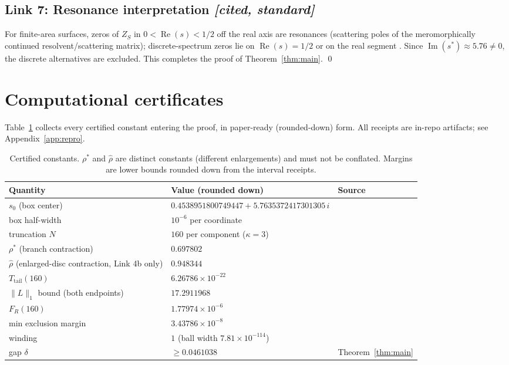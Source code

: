 \documentclass[11pt]{article}
\theoremstyle{definition}
\theoremstyle{remark}
\renewcommand{\Re}{\operatorname{Re}}
\renewcommand{\Im}{\operatorname{Im}}
\newcommand{\norm}[1]{\lVert #1 \rVert}
\begin{document}
\subsection*{Link 7: Resonance interpretation \emph{[cited, standard]}}

For finite-area surfaces, zeros of $Z_S$ in $0 < \Re(s) < 1/2$ off the
real axis are resonances (scattering poles of the meromorphically
continued resolvent/scattering matrix); discrete-spectrum zeros lie on
$\Re(s) = 1/2$ or on the real segment
\cite{HejhalLNM1001,IwaniecGSM53,BorthwickBook}. Since
$\Im(s^*) \approx 5.76 \neq 0$, the discrete alternatives are excluded.
This completes the proof of Theorem~\ref{thm:main}. \qed

\section{Computational certificates}
\label{sec:certs}

Table~\ref{tab:constants} collects every certified constant entering
the proof, in paper-ready (rounded-down) form. All receipts are
in-repo artifacts; see Appendix~\ref{app:repro}.

\begin{table}[h]
\centering
\begin{tabular}{lll}
\hline
Quantity & Value (rounded down) & Source \\
\hline
$s_0$ (box center) & $0.4538951800749447 + 5.7635372417301305\,i$ & \cite{R3bReceipt} \\
box half-width & $10^{-6}$ per coordinate & \cite{R3bReceipt} \\
truncation $N$ & $160$ per component ($\kappa = 3$) & \cite{R3bReceipt} \\
$\rho^*$ (branch contraction) & $0.697802$ & \cite{TBV2Receipt} \\
$\hat\rho$ (enlarged-disc contraction, Link 4b only) & $0.948344$ & \cite{E1Receipt} \\
$T_{\mathrm{tail}}(160)$ & $6.26786\times 10^{-22}$ & \cite{R2Receipt} \\
$\norm{L}_1$ bound (both endpoints) & $17.2911968$ & \cite{R3bReceipt} \\
$F_R(160)$ & $1.77974\times 10^{-6}$ & \cite{R3bReceipt} \\
min exclusion margin & $3.43786\times 10^{-8}$ & \cite{R3bReceipt} \\
winding & $1$ (ball width $7.81\times 10^{-114}$) & \cite{R3bReceipt} \\
gap $\delta$ & $\ge 0.0461038$ & Theorem~\ref{thm:main} \\
\hline
\end{tabular}
\caption{Certified constants. $\rho^*$ and $\hat\rho$ are distinct
constants (different enlargements) and must not be conflated. Margins
are lower bounds rounded down from the interval receipts.}
\label{tab:constants}
\end{table}
\end{document}
